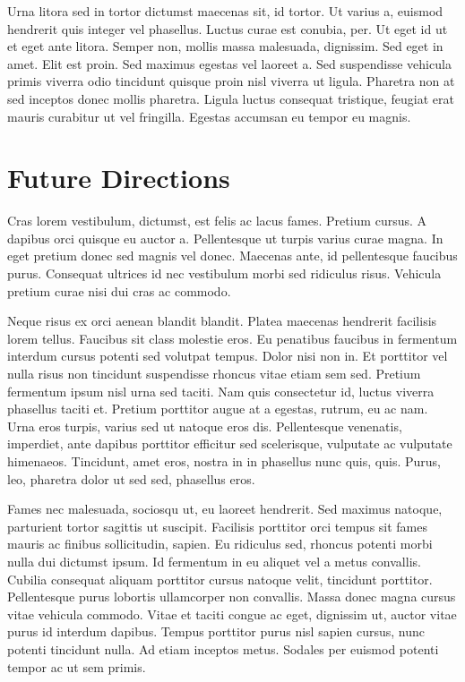 \documentclass[]{article}
\begin{document}
Urna litora sed in tortor dictumst maecenas sit, id tortor. Ut varius a,
euismod hendrerit quis integer vel phasellus. Luctus curae est conubia,
per. Ut eget id ut et eget ante litora. Semper non, mollis massa
malesuada, dignissim. Sed eget in amet. Elit est proin. Sed maximus
egestas vel laoreet a. Sed suspendisse vehicula primis viverra odio
tincidunt quisque proin nisl viverra ut ligula. Pharetra non at sed
inceptos donec mollis pharetra. Ligula luctus consequat tristique,
feugiat erat mauris curabitur ut vel fringilla. Egestas accumsan eu
tempor eu magnis.

\hypertarget{future-directions}{%
\section{Future Directions}\label{future-directions}}

Cras lorem vestibulum, dictumst, est felis ac lacus fames. Pretium
cursus. A dapibus orci quisque eu auctor a. Pellentesque ut turpis
varius curae magna. In eget pretium donec sed magnis vel donec. Maecenas
ante, id pellentesque faucibus purus. Consequat ultrices id nec
vestibulum morbi sed ridiculus risus. Vehicula pretium curae nisi dui
cras ac commodo.

Neque risus ex orci aenean blandit blandit. Platea maecenas hendrerit
facilisis lorem tellus. Faucibus sit class molestie eros. Eu penatibus
faucibus in fermentum interdum cursus potenti sed volutpat tempus. Dolor
nisi non in. Et porttitor vel nulla risus non tincidunt suspendisse
rhoncus vitae etiam sem sed. Pretium fermentum ipsum nisl urna sed
taciti. Nam quis consectetur id, luctus viverra phasellus taciti et.
Pretium porttitor augue at a egestas, rutrum, eu ac nam. Urna eros
turpis, varius sed ut natoque eros dis. Pellentesque venenatis,
imperdiet, ante dapibus porttitor efficitur sed scelerisque, vulputate
ac vulputate himenaeos. Tincidunt, amet eros, nostra in in phasellus
nunc quis, quis. Purus, leo, pharetra dolor ut sed sed, phasellus eros.

Fames nec malesuada, sociosqu ut, eu laoreet hendrerit. Sed maximus
natoque, parturient tortor sagittis ut suscipit. Facilisis porttitor
orci tempus sit fames mauris ac finibus sollicitudin, sapien. Eu
ridiculus sed, rhoncus potenti morbi nulla dui dictumst ipsum. Id
fermentum in eu aliquet vel a metus convallis. Cubilia consequat aliquam
porttitor cursus natoque velit, tincidunt porttitor. Pellentesque purus
lobortis ullamcorper non convallis. Massa donec magna cursus vitae
vehicula commodo. Vitae et taciti congue ac eget, dignissim ut, auctor
vitae purus id interdum dapibus. Tempus porttitor purus nisl sapien
cursus, nunc potenti tincidunt nulla. Ad etiam inceptos metus. Sodales
per euismod potenti tempor ac ut sem primis.
\end{document}
